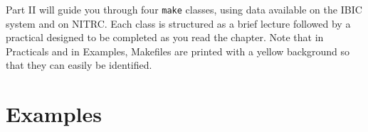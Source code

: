\documentclass[oneside,11pt]{memoir}
\newcommand\maken{\texttt{make}} %
\begin{document}
	\begin{vplace}[0.7]
		
		\thispagestyle{empty}
		\large
		\noindent Part II will guide you through four \maken{} classes, using data available on the IBIC system and on NITRC. Each class is structured as a brief lecture followed by a practical designed to be completed as you read the chapter.
		Note that in Practicals and in Examples, Makefiles are printed with a yellow background so that they can easily be identified. 
		
	\end{vplace}
	
	\renewcommand{\chaptername}{Practical}
	\renewcommand{\chapterautorefname}{Practical}
	
	
	
	
	
	\part{Examples}
	\renewcommand{\chaptername}{Example}
	\renewcommand{\chapterautorefname}{Example}
	
	

	
	
%	
	
	\cleardoublepage
	
	
	
\end{document}
